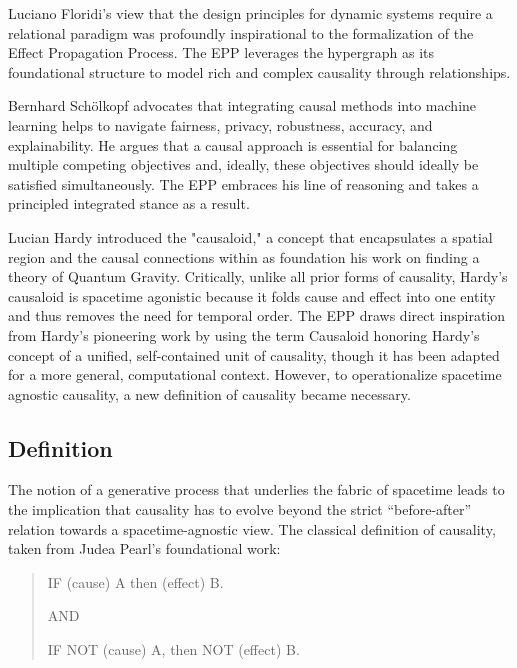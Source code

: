 Luciano Floridi's view\cite{floridi2025applied} that the design principles for  dynamic systems require a relational paradigm was profoundly inspirational to the formalization of the Effect Propagation Process. The EPP leverages the hypergraph as its foundational structure to model rich and complex causality through relationships. 

 Bernhard Schölkopf\cite{binkyte2025causalitykeyunderstandbalance} advocates that integrating causal methods into machine learning helps to navigate fairness, privacy, robustness, accuracy, and explainability. He argues that  a causal approach is essential for balancing multiple competing objectives and, ideally, these objectives should ideally be satisfied simultaneously. The EPP embraces his line of reasoning and takes a principled integrated stance as a result.  
 
Lucian Hardy introduced the "causaloid,"\cite{HardyDynamicCausalStructure} a concept that encapsulates a spatial region and the causal connections within  as foundation his work on finding a theory of Quantum Gravity. Critically, unlike all prior forms of causality, Hardy's causaloid is spacetime agonistic because it folds cause and effect into one entity and thus removes the need for temporal order. The EPP draws direct inspiration from Hardy’s pioneering work by using the term Causaloid honoring Hardy's concept of a unified, self-contained unit of causality, though it has been adapted for a more general, computational context. However, to operationalize spacetime agnostic causality, a new definition of causality became necessary. 

 
%
%
\subsection{Definition}
\label{sec:epp_definition}

The notion of a generative process that underlies the fabric of spacetime leads to the implication that causality has to evolve beyond the strict “before-after” relation towards a spacetime-agnostic view. The classical definition of causality, taken from Judea Pearl's foundational work\cite{pearl2000causality}: 

\begin{quote}
    IF (cause) A then (effect) B.
    
    AND 
    
    IF NOT (cause) A, then NOT (effect) B.
\end{quote}

